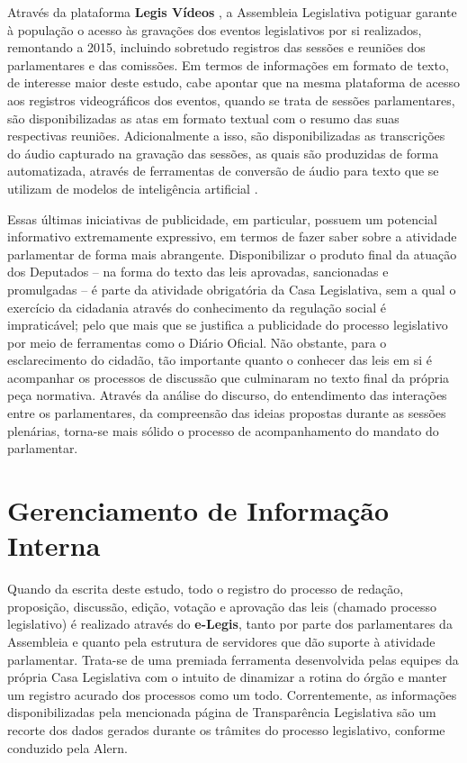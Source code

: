 Através da plataforma \textbf{Legis Vídeos} \cite{ALERN:6}, a Assembleia Legislativa potiguar garante à população o acesso às gravações dos eventos legislativos por si realizados, remontando a 2015, incluindo sobretudo registros das sessões e reuniões dos parlamentares e das comissões. Em termos de informações em formato de texto, de interesse maior deste estudo, cabe apontar que na mesma plataforma de acesso aos registros videográficos dos eventos, quando se trata de sessões parlamentares, são disponibilizadas as atas em formato textual com o resumo das suas respectivas reuniões. Adicionalmente a isso, são disponibilizadas as transcrições do áudio capturado na gravação das sessões, as quais são produzidas de forma automatizada, através de ferramentas de conversão de áudio para texto que se utilizam de modelos de inteligência artificial \cite{ALERN:3}.

Essas últimas iniciativas de publicidade, em particular, possuem um potencial informativo extremamente expressivo, em termos de fazer saber sobre a atividade parlamentar de forma mais abrangente. Disponibilizar o produto final da atuação dos Deputados -- na forma do texto das leis aprovadas, sancionadas e promulgadas -- é parte da atividade obrigatória da Casa Legislativa, sem a qual o exercício da cidadania através do conhecimento da regulação social é impraticável; pelo que mais que se justifica a publicidade do processo legislativo por meio de ferramentas como o Diário Oficial. Não obstante, para o esclarecimento do cidadão, tão importante quanto o conhecer das leis em si é acompanhar os processos de discussão que culminaram no texto final da própria peça normativa. Através da análise do discurso, do entendimento das interações entre os parlamentares, da compreensão das ideias propostas durante as sessões plenárias, torna-se mais sólido o processo de acompanhamento do mandato do parlamentar.

\section{Gerenciamento de Informação Interna}
\label{sec:DocAlern.2}

Quando da escrita deste estudo, todo o registro do processo de redação, proposição, discussão, edição, votação e aprovação das leis (chamado processo legislativo) é realizado através do \textbf{e-Legis}, tanto por parte dos parlamentares da Assembleia e quanto pela estrutura de servidores que dão suporte à atividade parlamentar. Trata-se de uma premiada ferramenta desenvolvida pelas equipes da própria Casa Legislativa com o intuito de dinamizar a rotina do órgão e manter um registro acurado dos processos como um todo. Correntemente, as informações disponibilizadas pela mencionada página de Transparência Legislativa são um recorte dos dados gerados durante os trâmites do processo legislativo, conforme conduzido pela \ac{Alern}.

